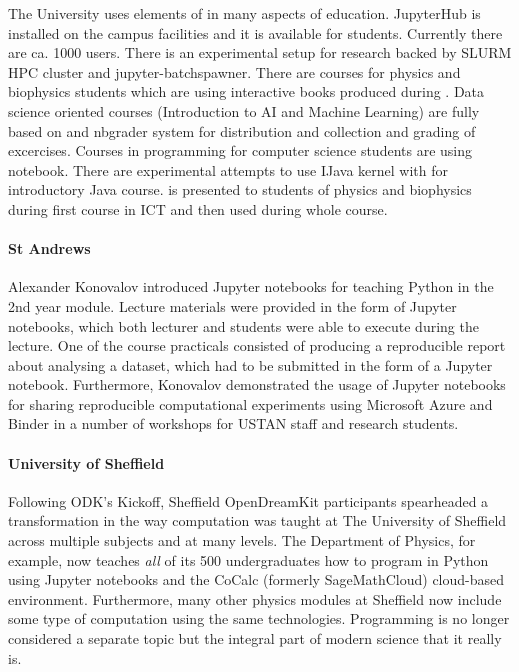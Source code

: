\documentclass{deliverablereport}
\begin{document}
  The University uses elements of \ODK in many aspects of
  education. JupyterHub is installed on the campus facilities and it
  is available for students. Currently there are ca. 1000
  users. There is an experimental setup for research backed by SLURM
  HPC cluster and jupyter-batchspawner. There are courses for physics
  and biophysics students which are using interactive books produced
  during \ODK. Data science oriented courses (Introduction to AI and
  Machine Learning) are fully based on \Jupyter and nbgrader system for
  distribution and collection and grading of excercises. Courses in
  \Python programming for computer science students are using \Jupyter
  notebook. There are experimental attempts to use IJava kernel with
  \Jupyter for introductory Java course. \SageMath is presented to
  students of physics and biophysics during first course in ICT and
  then used during whole course. 

\paragraph{St Andrews}
  Alexander Konovalov introduced Jupyter notebooks
  for teaching Python in the 2nd year module. Lecture materials 
  were provided in the form of Jupyter notebooks, which both lecturer
  and students were able to execute during the lecture. One of the
  course practicals consisted of producing a reproducible report
  about analysing a dataset, which had to be submitted in the form
  of a Jupyter notebook. Furthermore, Konovalov demonstrated the usage
  of Jupyter notebooks for sharing reproducible computational 
  experiments using Microsoft Azure and Binder in a number of 
  workshops for USTAN staff and research students.

\paragraph{University of Sheffield}
  Following ODK's Kickoff,
  Sheffield OpenDreamKit participants spearheaded a transformation in
  the way computation was taught at The University of Sheffield across
  multiple subjects and at many levels. The Department of Physics, for
  example, now teaches \emph{all} of its 500 undergraduates how to program
  in Python using Jupyter notebooks and the CoCalc (formerly
  SageMathCloud) cloud-based environment. Furthermore, many other
  physics modules at Sheffield now include some type of computation
  using the same technologies. Programming is no longer considered
  a separate topic but the integral part of modern science that it really
  is.
\end{document}
